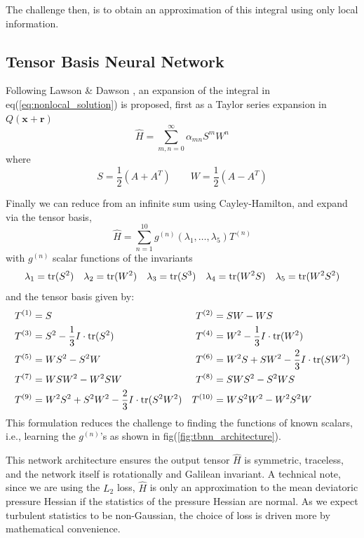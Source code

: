 The challenge then, is to obtain an approximation of this integral using only local information.


\subsection{Tensor Basis Neural Network}
Following Lawson \& Dawson \cite{lawson2015}, an expansion of the integral in eq(\ref{eq:nonlocal_solution}) is proposed, first as a Taylor series expansion in $Q({\bm x}+{\bm r})$
\begin{equation}
  \hat{H} = \sum_{m,n = 0}^\infty \alpha_{mn}S^mW^n
\end{equation}
where
\begin{equation}
  S = \frac{1}{2}(A + A^T) \qquad W = \frac{1}{2}(A - A^T)
\end{equation}

Finally we can reduce from an infinite sum using Cayley-Hamilton, and expand via the tensor basis\cite{zheng1993},\cite{pope1975}
\begin{equation}
  \hat{H} = \sum_{n=1}^{10} g^{(n)}(\lambda_1, \dots, \lambda_5)T^{(n)}
\end{equation}
with $g^{(n)}$ scalar functions of the invariants
\begin{equation}
  \lambda_1 = \text{tr}(S^2) \quad \lambda_2 = \text{tr}(W^2) \quad \lambda_3 = \text{tr}(S^3) \quad \lambda_4 = \text{tr}(W^2S) \quad \lambda_5 = \text{tr}(W^2S^2)
\end{equation}
and the tensor basis given by:
\begin{align} \label{eq:tb_start}
  &T^{(1)} = S &T^{(2)} &= SW-WS\\
  &T^{(3)} = S^2 - \frac{1}{3}I \cdot \text{tr}(S^2) &T^{(4)} &= W^2 - \frac{1}{3}I \cdot \text{tr}(W^2)\\
  &T^{(5)} = WS^2 - S^2W &T^{(6)} &= W^2S + SW^2 - \frac{2}{3}I \cdot \text{tr}(SW^2)\\
  &T^{(7)} = WSW^2-W^2SW &T^{(8)} &= SWS^2 - S^2WS\\
  &T^{(9)} = W^2S^2 + S^2W^2 - \frac{2}{3}I \cdot \text{tr}(S^2W^2) &T^{(10)} &= WS^2W^2 - W^2S^2W \label{eq:tb_end}
\end{align}
This formulation reduces the challenge to finding the functions of known scalars, i.e., learning the $g^{(n)}$'s as shown in fig(\ref{fig:tbnn_architecture}).

This network architecture ensures the output tensor $\hat{H}$ is symmetric, traceless, and the network itself is rotationally and Galilean invariant. A technical note, since we are using the $L_2$ loss, $\hat{H}$ is only an approximation to the mean deviatoric pressure Hessian if the statistics of the pressure Hessian are normal. As we expect turbulent statistics to be non-Gaussian, the choice of loss is driven more by mathematical convenience. 

